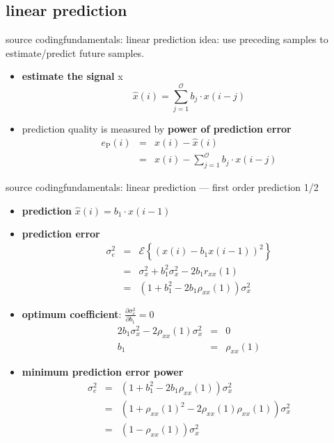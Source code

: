 \subsection{linear prediction}
	\begin{frame}{source coding}{fundamentals: linear prediction}
		idea: use preceding samples to estimate/predict future samples.
		\begin{itemize}
			\item	\textbf{estimate the signal} x
				\begin{equation*}
					\hat{x}(i) = \sum\limits_{j=1}^{\mathcal{O}}{b_j\cdot x(i-j)}
				\end{equation*}
			\pause
			\item	prediction quality is measured by \textbf{power of prediction error}
				\begin{eqnarray*}
					e_{\mathrm{P}}(i)	&=& x(i)-\hat{x}(i)\\
							&=& x(i) - \sum\limits_{j=1}^{\mathcal{O}}{b_j\cdot x(i-j)}
				\end{eqnarray*}
		\end{itemize}						
	\end{frame}
	\begin{frame}{source coding}{fundamentals: linear prediction --- first order prediction 1/2}
        \begin{itemize}
            \item   \textbf{prediction}
                $\hat{x}(i) = b_1\cdot x(i-1)$
            \pause
            \item   \textbf{prediction error}
				\begin{eqnarray*}
                    \sigma_e^2 &=& \mathcal{E}\left\lbrace (x(i)-b_1x(i-1))^2\right\rbrace\\
                    &=& \sigma_x^2 + b_1^2 \sigma_x^2 -2b_1 r_{xx}(1)\\
                    &=& \left(1 + b_1^2 - 2b_1\rho_{xx}(1)\right) \sigma_x^2
				\end{eqnarray*}
            \pause
            \item   \textbf{optimum coefficient}: $\frac{\partial\sigma_e^2}{\partial b_1} = 0$
				\begin{eqnarray*}
                    2b_1\sigma_x^2 - 2\rho_{xx}(1)\sigma_x^2 &=& 0\\
                    b_1 &=& \rho_{xx}(1)
				\end{eqnarray*}
            \pause
            \item   \textbf{minimum prediction error power}
				\begin{eqnarray*}
                    \sigma_e^2 &=& \left(1 + b_1^2 - 2b_1\rho_{xx}(1)\right) \sigma_x^2\\
                    &=& \left(1 + \rho_{xx}(1)^2 - 2\rho_{xx}(1)\rho_{xx}(1)\right) \sigma_x^2\\
                    &=& (1-\rho_{xx}(1))\sigma_x^2
				\end{eqnarray*}
        \end{itemize}
	\end{frame}
